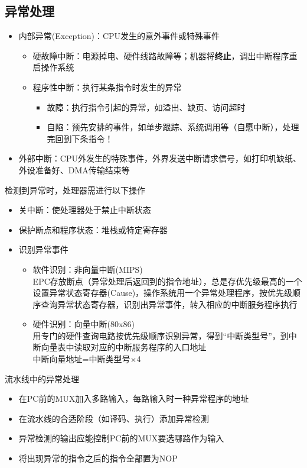 \subsection{异常处理}
\begin{itemize}
	\item 内部异常(Exception)：CPU发生的意外事件或特殊事件
	\begin{itemize}
		\item 硬故障中断：电源掉电、硬件线路故障等；机器将\textbf{终止}，调出中断程序重启操作系统
		\item 程序性中断：执行某条指令时发生的异常
		\begin{itemize}
			\item 故障：执行指令引起的异常，如溢出、缺页、访问超时
			\item 自陷：预先安排的事件，如单步跟踪、系统调用等（自愿中断），处理完回到下条指令！
		\end{itemize}
	\end{itemize}
	\item 外部中断：CPU外发生的特殊事件，外界发送中断请求信号，如打印机缺纸、外设准备好、DMA传输结束等
\end{itemize}
\par 检测到异常时，处理器需进行以下操作
\begin{itemize}
	\item 关中断：使处理器处于禁止中断状态
	\item 保护断点和程序状态：堆栈或特定寄存器
	\item 识别异常事件
	\begin{itemize}
		\item 软件识别：非向量中断(MIPS)\\
		EPC存放断点（异常处理后返回到的指令地址），总是存优先级最高的一个\\
		设置异常状态寄存器(Cause)，操作系统用一个异常处理程序，按优先级顺序查询异常状态寄存器，识别出异常事件，转入相应的中断服务程序执行
		\item 硬件识别：向量中断(80x86)\\
		用专门的硬件查询电路按优先级顺序识别异常，得到“中断类型号”，到中断向量表中读取对应的中断服务程序的入口地址\\
		中断向量地址=中断类型号$\times$4
	\end{itemize}
\end{itemize}
\par 流水线中的异常处理
\begin{itemize}
	\item 在PC前的MUX加入多路输入，每路输入时一种异常程序的地址
	\item 在流水线的合适阶段（如译码、执行）添加异常检测
	\item 异常检测的输出应能控制PC前的MUX要选哪路作为输入
	\item 将出现异常的指令之后的指令全部置为NOP
\end{itemize}

